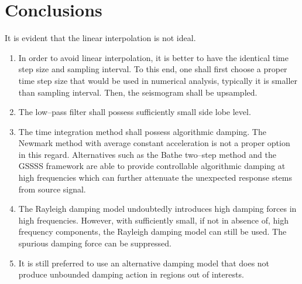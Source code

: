 \section{Conclusions}
It is evident that the linear interpolation is not ideal.
\begin{enumerate}
\item In order to avoid linear interpolation, it is better to have the identical time step size and sampling interval. To this end, one shall first choose a proper time step size that would be used in numerical analysis, typically it is smaller than sampling interval. Then, the seismogram shall be upsampled.
\item The low--pass filter shall possess sufficiently small side lobe level.
\item The time integration method shall possess algorithmic damping. The Newmark method with average constant acceleration is not a proper option in this regard. Alternatives such as the Bathe two--step method and the GSSSS framework are able to provide controllable algorithmic damping at high frequencies which can further attenuate the unexpected response stems from source signal.
\item The Rayleigh damping model undoubtedly introduces high damping forces in high frequencies. However, with sufficiently small, if not in absence of, high frequency components, the Rayleigh damping model can still be used. The spurious damping force can be suppressed.
\item It is still preferred to use an alternative damping model that does not produce unbounded damping action in regions out of interests.
\end{enumerate}